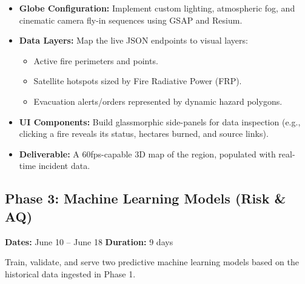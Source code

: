 \documentclass[12pt,letterpaper]{article}
\begin{document}
\begin{itemize}
    \item \textbf{Globe Configuration:} Implement custom lighting, atmospheric fog, and cinematic camera fly-in sequences using GSAP and Resium.
    \item \textbf{Data Layers:} Map the live JSON endpoints to visual layers:
    \begin{itemize}
        \item Active fire perimeters and points.
        \item Satellite hotspots sized by Fire Radiative Power (FRP).
        \item Evacuation alerts/orders represented by dynamic hazard polygons.
    \end{itemize}
    \item \textbf{UI Components:} Build glassmorphic side-panels for data inspection (e.g., clicking a fire reveals its status, hectares burned, and source links).
    \item \textbf{Deliverable:} A 60fps-capable 3D map of the region, populated with real-time incident data.
\end{itemize}

\subsection*{Phase 3: Machine Learning Models (Risk \& AQ)}
\textbf{Dates:} June 10 -- June 18 \hfill \textbf{Duration:} 9 days

\begin{goalbox}
Train, validate, and serve two predictive machine learning models based on the historical data ingested in Phase 1.
\end{goalbox}
\end{document}
